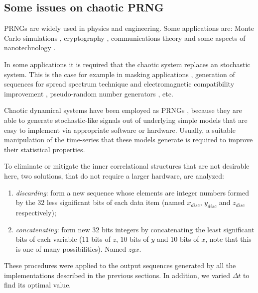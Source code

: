 \subsection{Some issues on chaotic PRNG}
\label{sec:PRNG}

PRNGs are widely used in physics and engineering. Some
applications are: Monte Carlo simulations \cite{Mertens2004},
cryptography \cite {Carlisle2007}, communications theory
\cite{Kocarev2001} and some aspects of nanotechnology
\cite{Popescu2000}.

In some applications it is required that the chaotic system
replaces an stochastic system. This is the case for example in
masking applications \cite{Fernandez2003}, generation of sequences
for spread spectrum technique \cite{Setti2004,DeMicco2007B} and
electromagnetic compatibility improvement \cite{Callegari2003A},
pseudo-random number generators
\cite{Kocarev2003,Larrondo2006,DeMicco2009}, etc.

Chaotic dynamical systems have been employed as PRNGs
\cite{Kocarev2003,Larrondo2006,DeMicco2009}, because they are able
to generate stochastic-like signals out of underlying simple
models that are easy to implement via appropriate software or
hardware. Usually, a suitable manipulation of the time-series that
these models generate is required to improve their statistical
properties.

To eliminate or mitigate the inner correlational structures that
are not desirable here, two solutions, that do not require a larger hardware, are analyzed:
\begin{enumerate}
\item \textit{discarding}: form a new sequence whose elements are
integer numbers formed by the $32$ less significant bits of each
data item (named $x_{disc}$, $y_{disc}$ and $z_{disc}$
respectively); \item \textit{concatenating}: form new $32$ bits
integers by concatenating the least significant bits of each
variable ($11$ bits of $z$, $10$ bits of $y$ and $10$ bits of $x$,
note that this is one of many possibilities). Named $zyx$.
\end{enumerate}

These procedures were applied to the output sequences
generated by all the implementations described in the previous
sections. In addition, we varied $\Delta t$ to find its optimal value.

